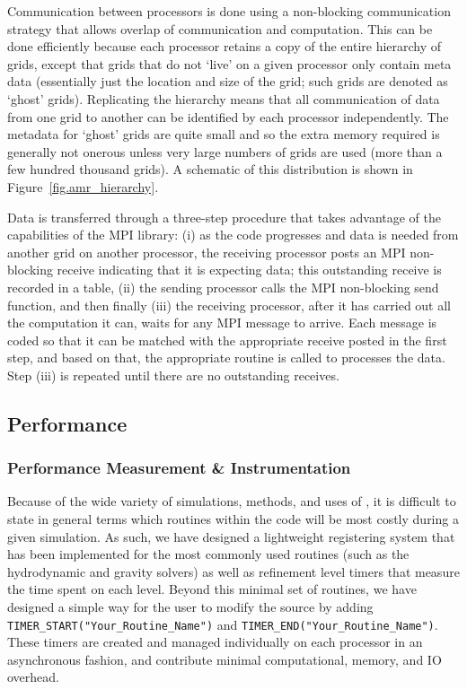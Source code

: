 Communication between processors is done using a non-blocking
communication strategy that allows overlap of communication and
computation.  This can be done efficiently because each processor
retains a copy of the entire hierarchy of grids, except that grids
that do not `live' on a given processor only contain meta data
(essentially just the location and size of the grid; such grids are
denoted as `ghost' grids).  Replicating the hierarchy means that all
communication of data from one grid to another can be identified by
each processor independently.  The metadata for `ghost' grids are
quite small and so the extra memory required is generally not onerous
unless very large numbers of grids are used (more than a few hundred
thousand grids).  A schematic of this distribution is shown in
Figure~\ref{fig.amr_hierarchy}.

Data is transferred through a three-step procedure that takes
advantage of the capabilities of the MPI library: (i) as the code
progresses and data is needed from another grid on another processor,
the receiving processor posts an MPI non-blocking receive indicating
that it is expecting data; this outstanding receive is recorded in a
table, (ii) the sending processor calls the MPI non-blocking send
function, and then finally (iii) the receiving processor, after it has
carried out all the computation it can, waits for any MPI message to
arrive.  Each message is coded so that it can be matched with the
appropriate receive posted in the first step, and based on that, the
appropriate routine is called to processes the data.  Step (iii) is
repeated until there are no outstanding receives.


\subsection{Performance}
\label{sec.performance}

\subsubsection{Performance Measurement \& Instrumentation}

Because of the wide variety of simulations, methods, and uses of
\enzo, it is difficult to state in general terms which routines within
the code will be most costly during a given simulation.  As such, we
have designed a lightweight registering system that has been
implemented for the most commonly used routines (such as the
hydrodynamic and gravity solvers) as well as refinement level timers
that measure the time spent on each level.  Beyond this minimal set of
routines, we have designed a simple way for the user to modify the
source by adding \texttt{TIMER\_START("Your\_Routine\_Name")} and
\texttt{TIMER\_END("Your\_Routine\_Name")}.  These timers are created
and managed individually on each processor in an asynchronous fashion,
and contribute minimal computational, memory, and IO overhead.

